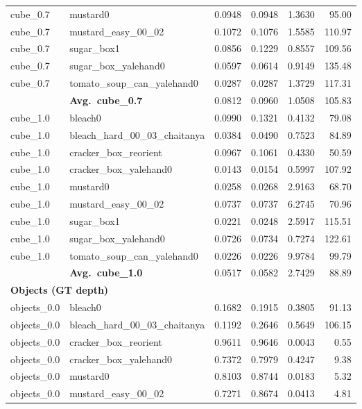 \begin{longtable}{llrrrr}
  cube_0.7 & mustard0 & 0.0948 & 0.0948 & 1.3630 & 95.00 \\
  cube_0.7 & mustard\_easy\_00\_02 & 0.1072 & 0.1076 & 1.5585 & 110.97 \\
  cube_0.7 & sugar\_box1 & 0.0856 & 0.1229 & 0.8557 & 109.56 \\
  cube_0.7 & sugar\_box\_yalehand0 & 0.0597 & 0.0614 & 0.9149 & 135.48 \\
  cube_0.7 & tomato\_soup\_can\_yalehand0 & 0.0287 & 0.0287 & 1.3729 & 117.31 \\
  \cmidrule{2-6}
  & \textbf{Avg.~cube_0.7} & 0.0812 & 0.0960 & 1.0508 & 105.83 \\
  \midrule
  cube_1.0 & bleach0 & 0.0990 & 0.1321 & 0.4132 & 79.08 \\
  cube_1.0 & bleach\_hard\_00\_03\_chaitanya & 0.0384 & 0.0490 & 0.7523 & 84.89 \\
  cube_1.0 & cracker\_box\_reorient & 0.0967 & 0.1061 & 0.4330 & 50.59 \\
  cube_1.0 & cracker\_box\_yalehand0 & 0.0143 & 0.0154 & 0.5997 & 107.92 \\
  cube_1.0 & mustard0 & 0.0258 & 0.0268 & 2.9163 & 68.70 \\
  cube_1.0 & mustard\_easy\_00\_02 & 0.0737 & 0.0737 & 6.2745 & 70.96 \\
  cube_1.0 & sugar\_box1 & 0.0221 & 0.0248 & 2.5917 & 115.51 \\
  cube_1.0 & sugar\_box\_yalehand0 & 0.0726 & 0.0734 & 0.7274 & 122.61 \\
  cube_1.0 & tomato\_soup\_can\_yalehand0 & 0.0226 & 0.0226 & 9.9784 & 99.79 \\
  \cmidrule{2-6}
  & \textbf{Avg.~cube_1.0} & 0.0517 & 0.0582 & 2.7429 & 88.89 \\
  \midrule
\multicolumn{6}{l}{\textbf{Objects (GT depth)}} \\
\midrule
  objects_0.0 & bleach0 & 0.1682 & 0.1915 & 0.3805 & 91.13 \\
  objects_0.0 & bleach\_hard\_00\_03\_chaitanya & 0.1192 & 0.2646 & 0.5649 & 106.15 \\
  objects_0.0 & cracker\_box\_reorient & 0.9611 & 0.9646 & 0.0043 & 0.55 \\
  objects_0.0 & cracker\_box\_yalehand0 & 0.7372 & 0.7979 & 0.4247 & 9.38 \\
  objects_0.0 & mustard0 & 0.8103 & 0.8744 & 0.0183 & 5.32 \\
  objects_0.0 & mustard\_easy\_00\_02 & 0.7271 & 0.8674 & 0.0413 & 4.81 \\

\end{longtable}
